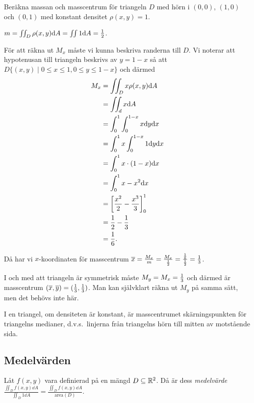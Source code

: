 \documentclass[a4paper]{article}
\begin{document}
\begin{ex}
    Beräkna massan och masscentrum för triangeln \(
        D
    \) med hörn i \(
        (0,0)
    \), \(
        (1,0)
    \) och \(
        (0,1)
    \) med konstant densitet \(
        \rho(x,y) = 1
    \).

    \(
        m = \iint_D \rho(x,y) \dd A
            = \iint 1 \dd A
            = \frac{1}{2}
    \).

    För att räkna ut \(
        M_x
    \) måste vi kunna beskriva randerna till \(
        D
    \). Vi noterar att hypotenusan till triangeln beskrivs av \(
        y = 1-x
    \) så att \(
        D \{ (x,y) \; | \; 0 \leq x \leq 1, 0 \leq y \leq 1-x\}
    \) och därmed 
    \begin{align*}
        M_x &= \iint_D x \rho(x,y) \dd A\\
            &= \iint_d x \dd A\\
            &= \int_0^1 \int_0^{1-x} x \dd y \dd x\\
            &= \int_0^1 x \int_0^{1-x} 1 \dd y \dd x \\
            &= \int_0^1 x\cdot(1-x) \dd x \\
            &= \int_0^1 x-x^2 \dd x  \\
            &= \left[ \frac{x^2}{2} - \frac{x^3}{3} \right]_0^1  \\
            &= \frac{1}{2} - \frac{1}{3}  \\
            &= \frac{1}{6}.
    \end{align*}

    Då har vi \(
        x
    \)-koordinaten för masscentrum \(
        \overline{x} = \frac{M_x}{m} = \frac{M_x}{\frac{1}{2}} = \frac{\frac{1}{6}}{\frac{1}{2}} = \frac{1}{3}
    \).

    I och med att triangeln är symmetrisk måste \(
        M_y = M_x = \frac{1}{3}
    \) och därmed är masscentrum \(
        (\overline{x}, \overline{y}) = (\frac{1}{3}, \frac{1}{3})
    \). Man kan självklart räkna ut \(
        M_y
    \) på samma sätt, men det behövs inte här.
\end{ex}

\begin{sats}
    I en triangel, om densiteten är konstant, är masscentrumet skärningspunkten
    för triangelns medianer, d.v.s.\ linjerna från triangelns hörn till mitten
    av motstående sida.
\end{sats}

\subsection{Medelvärden}
\begin{sats}
    Låt \(
        f(x,y)
    \) vara definierad på en mängd \(
        D \subseteq \mathbb{R}^2
    \). Då är dess \emph{medelvärde} \(
        \frac{\iint_D f(x,y) \dd A}{\iint_D 1 \dd A}
        = \frac{\iint_D f(x,y) \dd A}{\text{area}(D)} 
    \).
\end{sats}
\end{document}
